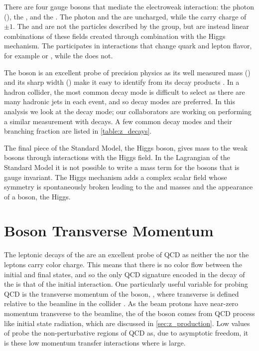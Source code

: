 There are four gauge bosons that mediate the electroweak interaction: the
photon (\photon), the \Z, and the \Wpm. The photon and the \Z are uncharged,
while the \Wpm carry charge of $\pm1$. The \W and \Z are not the particles
described by the \SUtwoUone group, but are instead linear combinations of these
fields created through combination with the Higgs mechanism. The \W
participates in interactions that change quark and lepton flavor, for example
\tWdecay or \mutoWnu, while the \Z does not.

The \Z boson is an excellent probe of precision physics as its well measured
mass (\Zmass) and its sharp width (\Zwidth) make it easy to identify from its
decay products \cite{pdg2014}. In a hadron collider, the most common \Ztoqq
decay mode is difficult to select as there are many hadronic jets in each
event, and so \Ztoll decay modes are preferred. In this analysis we look at the
\Ztoee decay mode; our collaborators are working on performing a similar
measurement with \Ztomumu decays. A few common decay modes and their branching
fraction are listed in \cref{table:z_decays}.



The final piece of the Standard Model, the Higgs boson, gives mass to the weak
bosons through interactions with the Higgs field. In the Lagrangian of the
Standard Model it is not possible to write a mass term for the bosons that is
gauge invariant. The Higgs mechanism adds a complex scalar field whose symmetry
is spontaneously broken leading to the \W and \Z masses and the appearance of a
\spinzero boson, the Higgs.

\section{\texorpdfstring{\Z}{Z} Boson Transverse Momentum}

The leptonic decays of the \Z are an excellent probe of QCD as neither the \Z
nor the leptons carry color charge. This means that there is no color flow
between the initial and final states, and so the only QCD signature encoded in
the decay of the \Z is that of the initial interaction. One particularly useful
variable for probing QCD is the transverse momentum of the \Z boson, \bosonpt,
where transverse is defined relative to the beamline in the collider
\cite{bozzi_2011,mantry_2011,becher_2011}. As the beam protons have near-zero
momentum transverse to the beamline, the \bosonpt of the \Z boson comes from
QCD process like initial state radiation, which are discussed in
\cref{sec:z_production}. Low values of \bosonpt probe the non-perturbative
regions of QCD as, due to asymptotic freedom, it is these low momentum transfer
interactions where \alphastrong is large.

